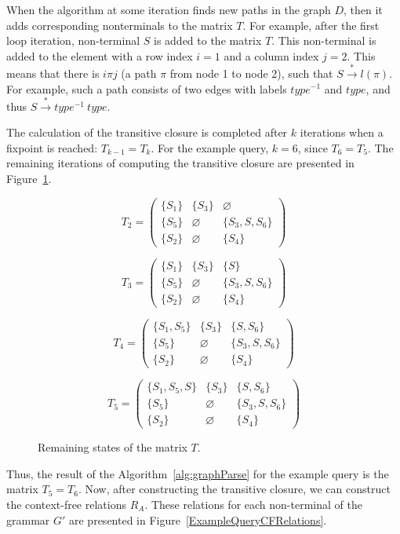 \documentclass[runningheads,a4paper]{llncs}
\begin{document}
When the algorithm at some iteration finds new paths in the graph $D$, then it adds corresponding nonterminals to the matrix $T$. For example, after the first loop iteration, non-terminal $S$ is added to the matrix $T$. This non-terminal is added to the element with a row index $i = 1$ and a column index $j = 2$. This means that there is $i\pi j$ (a path $\pi$ from node 1 to node 2), such that $S \xrightarrow{*} l(\pi)$. For example, such a path consists of two edges with labels $type^{-1}$ and $type$, and thus $S \xrightarrow{*} type^{-1} \ type$.

The calculation of the transitive closure is completed after $k$ iterations when a fixpoint is reached: $T_{k-1} = T_k$. For the example query, $k = 6$, since $T_6 = T_5$. The remaining iterations of computing the transitive closure are presented in Figure~\ref{ExampleQueryFinalIterations}.

\begin{figure}[h]
	\[
	T_2 = \begin{pmatrix}
	\{S_1\} & \{S_3\} & \varnothing \\ \{S_5\} & \varnothing & \{S_3, S, S_6\} \\ \{S_2\} & \varnothing & \{S_4\}
	\end{pmatrix}
	\]
	
	\[
	T_3 = \begin{pmatrix}
	\{S_1\} & \{S_3\} & \{S\} \\ \{S_5\} & \varnothing & \{S_3, S, S_6\} \\ \{S_2\} & \varnothing & \{S_4\}
	\end{pmatrix}
	\]
	
	\[
	T_4 = \begin{pmatrix}
	\{S_1, S_5\} & \{S_3\} & \{S, S_6\} \\ \{S_5\} & \varnothing & \{S_3, S, S_6\} \\ \{S_2\} & \varnothing & \{S_4\}
	\end{pmatrix}
	\]
	
	\[
	T_5 = \begin{pmatrix}
	\{S_1, S_5, S\} & \{S_3\} & \{S, S_6\} \\ \{S_5\} & \varnothing & \{S_3, S, S_6\} \\ \{S_2\} & \varnothing & \{S_4\}
	\end{pmatrix}
	\]
	\caption{Remaining states of the matrix $T$.}
	\label{ExampleQueryFinalIterations}
\end{figure}

Thus, the result of the Algorithm~\ref{alg:graphParse} for the example query is the matrix $T_5 = T_6$. Now, after constructing the transitive closure, we can construct the context-free relations $R_A$. These relations for each non-terminal of the grammar $G'$ are presented in Figure~\ref{ExampleQueryCFRelations}.
\end{document}
